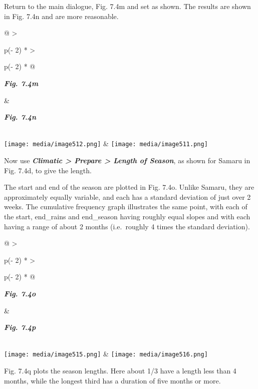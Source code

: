 \documentclass[
  letterpaper,
  DIV=11,
  numbers=noendperiod]{scrreprt}
\begin{document}
Return to the main dialogue, Fig. 7.4m and set as shown. The results are
shown in Fig. 7.4n and are more reasonable.

\begin{longtable}[]{@{}
  >{\raggedright\arraybackslash}p{(\columnwidth - 2\tabcolsep) * }
  >{\raggedright\arraybackslash}p{(\columnwidth - 2\tabcolsep) * }@{}}
\toprule\noalign{}
\begin{minipage}[b]{\linewidth}\raggedright
\textbf{\emph{Fig. 7.4m}}
\end{minipage} & \begin{minipage}[b]{\linewidth}\raggedright
\textbf{\emph{Fig. 7.4n}}
\end{minipage} \\
\midrule\noalign{}
\endhead
\bottomrule\noalign{}
\endlastfoot
\texttt{[image: media/image512.png]} &
\texttt{[image: media/image511.png]} \\
\end{longtable}

Now use \textbf{\emph{Climatic \textgreater{} Prepare \textgreater{}
Length of Season}}, as shown for Samaru in Fig. 7.4d, to give the
length.

The start and end of the season are plotted in Fig. 7.4o. Unlike Samaru,
they are approximately equally variable, and each has a standard
deviation of just over 2 weeks. The cumulative frequency graph
illustrates the same point, with each of the start, end\_rains and
end\_season having roughly equal slopes and with each having a range of
about 2 months (i.e.~roughly 4 times the standard deviation).

\begin{longtable}[]{@{}
  >{\raggedright\arraybackslash}p{(\columnwidth - 2\tabcolsep) * }
  >{\raggedright\arraybackslash}p{(\columnwidth - 2\tabcolsep) * }@{}}
\toprule\noalign{}
\begin{minipage}[b]{\linewidth}\raggedright
\textbf{\emph{Fig. 7.4o}}
\end{minipage} & \begin{minipage}[b]{\linewidth}\raggedright
\textbf{\emph{Fig. 7.4p}}
\end{minipage} \\
\midrule\noalign{}
\endhead
\bottomrule\noalign{}
\endlastfoot
\texttt{[image: media/image515.png]} &
\texttt{[image: media/image516.png]} \\
\end{longtable}

Fig. 7.4q plots the season lengths. Here about 1/3 have a length less
than 4 months, while the longest third has a duration of five months or
more.
\end{document}
